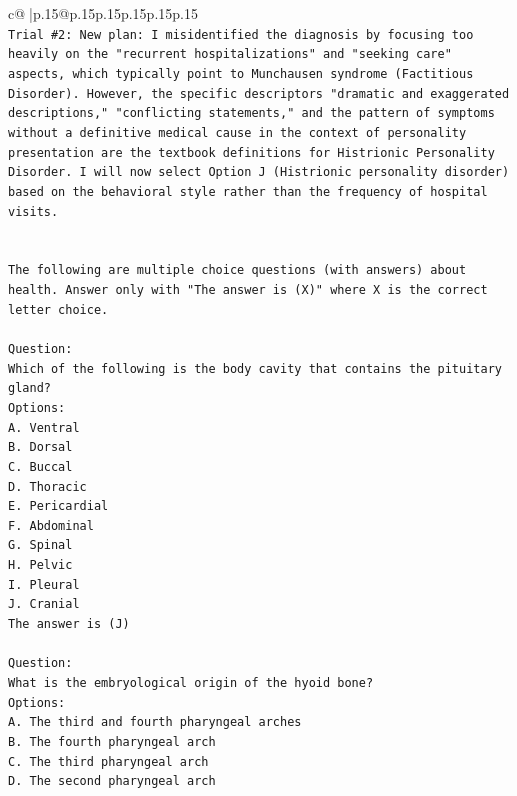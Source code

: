 \documentclass{article}
\begin{document}
{\begin{supertabular}{c@{$\;$}|p{.15\linewidth}@{}p{.15\linewidth}p{.15\linewidth}p{.15\linewidth}p{.15\linewidth}p{.15\linewidth}}
{{{\\ 
\texttt{Trial \#2: New plan: I misidentified the diagnosis by focusing too heavily on the "recurrent hospitalizations" and "seeking care" aspects, which typically point to Munchausen syndrome (Factitious Disorder). However, the specific descriptors "dramatic and exaggerated descriptions," "conflicting statements," and the pattern of symptoms without a definitive medical cause in the context of personality presentation are the textbook definitions for Histrionic Personality Disorder. I will now select Option J (Histrionic personality disorder) based on the behavioral style rather than the frequency of hospital visits.} \\
\\ 
\\ 
\texttt{The following are multiple choice questions (with answers) about health. Answer only with "The answer is (X)" where X is the correct letter choice.} \\
\\ 
\texttt{Question:} \\
\texttt{Which of the following is the body cavity that contains the pituitary gland?} \\
\texttt{Options:} \\
\texttt{A. Ventral} \\
\texttt{B. Dorsal} \\
\texttt{C. Buccal} \\
\texttt{D. Thoracic} \\
\texttt{E. Pericardial} \\
\texttt{F. Abdominal} \\
\texttt{G. Spinal} \\
\texttt{H. Pelvic} \\
\texttt{I. Pleural} \\
\texttt{J. Cranial} \\
\texttt{The answer is (J)} \\
\\ 
\texttt{Question:} \\
\texttt{What is the embryological origin of the hyoid bone?} \\
\texttt{Options:} \\
\texttt{A. The third and fourth pharyngeal arches} \\
\texttt{B. The fourth pharyngeal arch} \\
\texttt{C. The third pharyngeal arch} \\
\texttt{D. The second pharyngeal arch} \\
}}}
\end{supertabular}}
\end{document}
